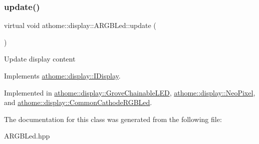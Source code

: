 \subsubsection{\texorpdfstring{update()}{update()}}
{\footnotesize\ttfamily virtual void athome\+::display\+::\+A\+R\+G\+B\+Led\+::update (\begin{DoxyParamCaption}{ }\end{DoxyParamCaption})\hspace{0.3cm}{\ttfamily [pure virtual]}}

Update display content 

Implements \mbox{\hyperlink{classathome_1_1display_1_1_i_display_a4ba7bd5d46f88578f1c846f4f5f3c5d1}{athome\+::display\+::\+I\+Display}}.



Implemented in \mbox{\hyperlink{classathome_1_1display_1_1_grove_chainable_l_e_d_a05a4a1381396b7fc11a24993865d8226}{athome\+::display\+::\+Grove\+Chainable\+L\+ED}}, \mbox{\hyperlink{classathome_1_1display_1_1_neo_pixel_a272bca4da78dff7dc02bcd023665e013}{athome\+::display\+::\+Neo\+Pixel}}, and \mbox{\hyperlink{classathome_1_1display_1_1_common_cathode_r_g_b_led_ab78ab6aef619d8e0941dd11d4cfbb545}{athome\+::display\+::\+Common\+Cathode\+R\+G\+B\+Led}}.



The documentation for this class was generated from the following file\+:\begin{DoxyCompactItemize}
\item 
A\+R\+G\+B\+Led.\+hpp\end{DoxyCompactItemize}

